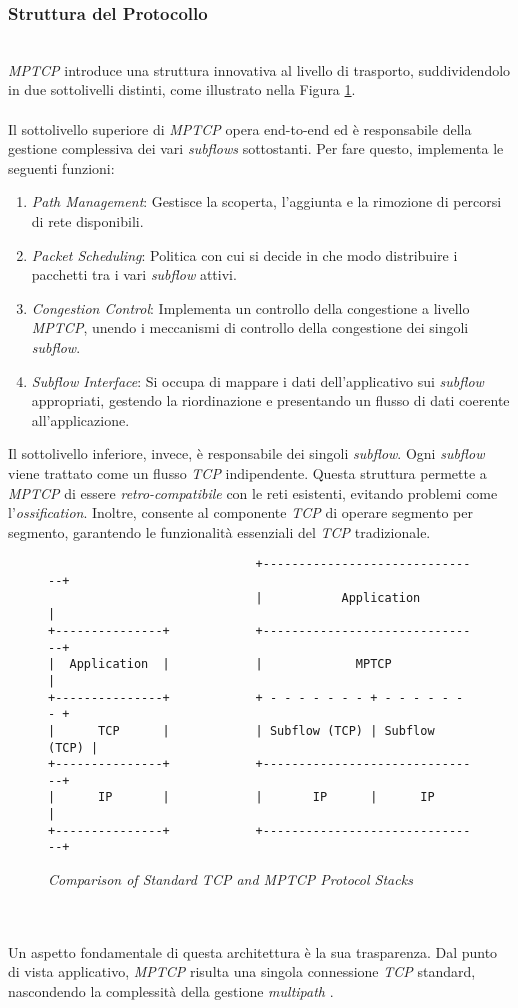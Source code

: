 \subsubsection{Struttura del Protocollo}
~\\
\indent \emph{MPTCP} introduce una struttura innovativa al livello di trasporto, suddividendolo in due sottolivelli distinti, come illustrato nella Figura \ref{comparison}.
\\\\
Il sottolivello superiore di \emph{MPTCP} opera end-to-end ed è responsabile della gestione complessiva dei vari \emph{subflows} sottostanti. Per fare questo, implementa le seguenti funzioni:
\begin{enumerate}[label=\roman*]
    \item \emph{Path Management}: Gestisce la scoperta, l'aggiunta e la rimozione di percorsi di rete disponibili.
    \item \emph{Packet Scheduling}: Politica con cui si decide in che modo distribuire i pacchetti tra i vari \emph{subflow} attivi.
    \item \emph{Congestion Control}: Implementa un controllo della congestione a livello \emph{MPTCP}, unendo i meccanismi di controllo della congestione dei singoli \emph{subflow}. 
    \item \emph{Subflow Interface}: Si occupa di mappare i dati dell'applicativo sui \emph{subflow} appropriati, gestendo la riordinazione e presentando un flusso di dati coerente all'applicazione.
\end{enumerate}
\noindent Il sottolivello inferiore, invece, è responsabile dei singoli \emph{subflow}. Ogni \emph{subflow} viene trattato come un flusso \emph{TCP} indipendente. Questa struttura permette a \emph{MPTCP} di essere \emph{retro-compatibile} con le reti esistenti, evitando problemi come l'\emph{ossification}. Inoltre, consente al componente \emph{TCP} di operare segmento per segmento, garantendo le funzionalità essenziali del \emph{TCP} tradizionale.
\begin{figure}[!h]
  \centering
    \begin{BVerbatim}
                             +-------------------------------+
                             |           Application         |
+---------------+            +-------------------------------+
|  Application  |            |             MPTCP             |
+---------------+            + - - - - - - - + - - - - - - - +
|      TCP      |            | Subflow (TCP) | Subflow (TCP) |
+---------------+            +-------------------------------+
|      IP       |            |       IP      |      IP       |
+---------------+            +-------------------------------+
               \end{BVerbatim}
    \caption{\emph{Comparison of Standard TCP and MPTCP Protocol Stacks}}
    \label{comparison}
    \end{figure}
\\\\
\noindent Un aspetto fondamentale di questa architettura è la sua trasparenza. Dal punto di vista applicativo, \emph{MPTCP} risulta una singola connessione \emph{TCP} standard, nascondendo la complessità della gestione \emph{multipath} \cite{site:mptcp-design}.
